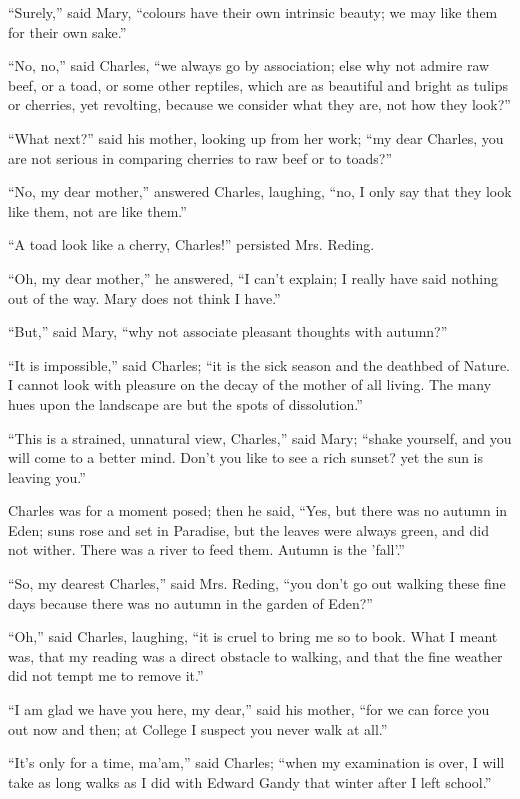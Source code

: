 ``Surely,'' said Mary, ``colours have their own
intrinsic beauty; we may like them for their own sake.''

``No, no,'' said Charles, ``we always go by
association; else why not admire raw beef, or a toad, or some other reptiles, which are as beautiful and bright as tulips or
cherries, yet revolting, because we consider what they are, not how
they look?''

``What next?'' said his mother, looking up from her work;
``my dear Charles, you are not serious in comparing cherries to
raw beef or to toads?''

``No, my dear mother,'' answered Charles, laughing,
``no, I only say that they look like them, not are like
them.''

``A toad look like a cherry, Charles!'' persisted Mrs.
Reding.

``Oh, my dear mother,'' he answered, ``I can't explain;
I really have said nothing out of the way. Mary does not think I
have.''

``But,'' said Mary, ``why not associate pleasant
thoughts with autumn?''

``It is impossible,'' said Charles; ``it is the sick
season and the deathbed of Nature. I cannot look with pleasure on the
decay of the mother of all living. The many hues upon the landscape
are but the spots of dissolution.''

``This is a strained, unnatural view, Charles,'' said Mary;
``shake yourself, and you will come to a better mind. Don't you
like to see a rich sunset? yet the sun is leaving you.''

Charles was for a moment posed; then he said, ``Yes, but there
was no autumn in Eden; suns rose and set in Paradise, but the leaves
were always green, and did not wither. There was a river to feed them.
Autumn is the 'fall'.''

``So, my dearest Charles,'' said Mrs. Reding, ``you
don't go out walking these fine days because there was no autumn
in the garden of Eden?''

``Oh,'' said Charles, laughing, ``it is cruel to bring
me so to book. What I meant was, that my reading was a direct obstacle
to walking, and that the fine weather did not tempt me to remove
it.''

``I am glad we have you here, my dear,'' said his mother,
``for we can force you out now and then; at College I suspect you
never walk at all.''

``It's only for a time, ma'am,'' said Charles; ``when
my examination is over, I will take as long walks as I did with Edward
Gandy that winter after I left school.''

